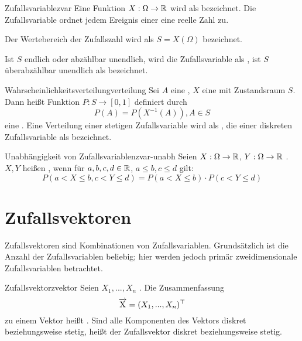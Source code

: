 \begin{definition}{Zufallsvariable}{zvar}
Eine Funktion $X: \Omega \to \mathbb{R}$ wird als 
bezeichnet. Die Zufallsvariable ordnet jedem Ereignis einer
 eine reelle Zahl zu.

Der Wertebereich der Zufallszahl wird als  $S = X(\Omega)$
bezeichnet.

Ist $S$ endlich oder abzählbar unendlich, wird die Zufallsvariable als
, ist $S$ überabzählbar unendlich als  bezeichnet.
\end{definition}

\begin{definition}{Wahrscheinlichkeitsverteilung}{verteilung}
Sei $A$ eine , $X$ eine 
mit Zustandsraum $S$. Dann heißt Funktion $P: S \rightarrow [0,1]$ definiert
durch
\[
P(A) = P(X^{-1}(A)), A \in S
\]
eine . Eine Verteilung einer stetigen
Zufallsvariable wird als , die einer diskreten
Zufallsvariable als  bezeichnet.
\end{definition}

\begin{definition}{Unabhängigkeit von Zufallsvariablen}{zvar-unabh}
Seien $X: \Omega \to \mathbb{R}$, $Y: \Omega \to \mathbb{R}$ . $X,
Y$ heißen , wenn für $a,b,c,d \in \mathbb{R}$, $a\le b, c\le d$ gilt:
\[
P(a < X\le b,c<Y\le d) = P(a<X\le b)\cdot P(c<Y\le d)
\]
\end{definition}

\section{Zufallsvektoren}

Zufallsvektoren sind Kombinationen von Zufallsvariablen. Grundsätzlich ist die
Anzahl der Zufallsvariablen beliebig; hier werden jedoch primär zweidimensionale
Zufallsvariablen betrachtet.

\begin{definition}{Zufallsvektor}{zvektor}
Seien $X_1, ..., X_n$ . Die Zusammenfassung
\[
\overrightarrow{\mathrm{X}} = (X_1, ..., X_n)^\top
\]
zu einem Vektor heißt . Sind alle Komponenten des Vektors
diskret beziehungsweise stetig, heißt der Zufallsvektor diskret beziehungsweise
stetig.
\end{definition}


